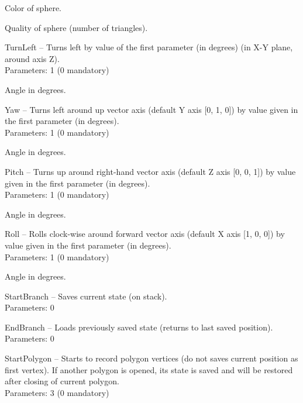 \begin{description*}
\begin{enumerate*}
            Color of sphere.				\item
            Quality of sphere (number of triangles).			\end{enumerate*}
		\item[TurnLeft]
			-- Turns left by value of the first parameter (in degrees) (in X-Y plane, around axis Z).
		\\ Parameters: 1  (0 mandatory) 
			\begin{enumerate*}
				\item
Angle in degrees.			\end{enumerate*}
		\item[Yaw]
			-- Turns left around up vector axis (default Y axis [0, 1, 0]) by value given in the first parameter (in degrees).
		\\ Parameters: 1  (0 mandatory) 
			\begin{enumerate*}
				\item
Angle in degrees.			\end{enumerate*}
		\item[Pitch]
			-- Turns up around right-hand vector axis (default Z axis [0, 0, 1]) by value given in the first parameter (in degrees).
		\\ Parameters: 1  (0 mandatory) 
			\begin{enumerate*}
				\item
Angle in degrees.			\end{enumerate*}
		\item[Roll]
			-- Rolls clock-wise around forward vector axis (default X axis [1, 0, 0]) by value given in the first parameter (in degrees).
		\\ Parameters: 1  (0 mandatory) 
			\begin{enumerate*}
				\item
Angle in degrees.			\end{enumerate*}
		\item[StartBranch]
			-- Saves current state (on stack).
		\\ Parameters: 0 
		\item[EndBranch]
			-- Loads previously saved state (returns to last saved position).
		\\ Parameters: 0 
		\item[StartPolygon]
			-- Starts to record polygon vertices (do not saves current position as first vertex).
            If another polygon is opened, its state is saved and will be restored after closing of current polygon.
		\\ Parameters: 3  (0 mandatory) 

\end{description*}
